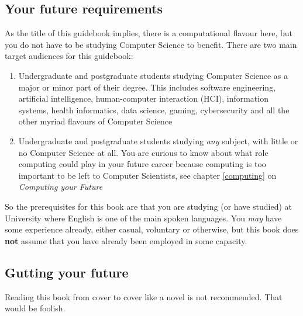 \documentclass[
]{book}
\providecommand{\tightlist}{%
  \setlength{\itemsep}{0pt}\setlength{\parskip}{0pt}}
\begin{document}
\hypertarget{prereq}{%
\subsection{Your future requirements}\label{prereq}}

As the title of this guidebook implies, there is a computational flavour here, but you do not have to be studying Computer Science to benefit. There are two main target audiences for this guidebook:

\begin{enumerate}
\def\labelenumi{\arabic{enumi}.}
\tightlist
\item
  Undergraduate and postgraduate students studying Computer Science as a major or minor part of their degree. This includes software engineering, artificial intelligence, human-computer interaction (HCI), information systems, health informatics, data science, gaming, cybersecurity and all the other myriad flavours of Computer Science
\item
  Undergraduate and postgraduate students studying \emph{any} subject, with little or no Computer Science at all. You are curious to know about what role computing could play in your future career because computing is too important to be left to Computer Scientists, see chapter \ref{computing} on \emph{Computing your Future}
\end{enumerate}

So the prerequisites for this book are that you are studying (or have studied) at University where English is one of the main spoken languages. You \emph{may} have some experience already, either casual, voluntary or otherwise, but this book does \textbf{not} assume that you have already been employed in some capacity.

\hypertarget{gut}{%
\subsection{Gutting your future}\label{gut}}

Reading this book from cover to cover like a novel is not recommended. That would be foolish.
\end{document}
